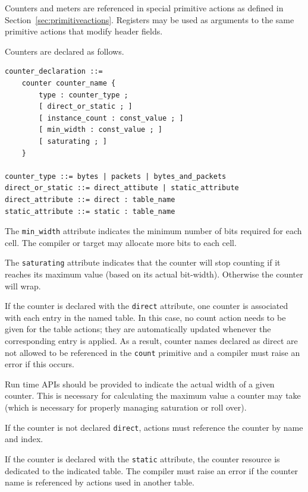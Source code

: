 \documentclass[12pt]{article}
\begin{document}
Counters and meters are referenced in special primitive actions as defined 
in Section~\ref{sec:primitiveactions}. Registers may be used as arguments to 
the same primitive actions that modify header fields.


Counters are declared as follows.

\begin{lstlisting}[style=BNFstyle]
counter_declaration ::=
    counter counter_name { 
        type : counter_type ;
        [ direct_or_static ; ]
        [ instance_count : const_value ; ]
        [ min_width : const_value ; ]
        [ saturating ; ]
    }

counter_type ::= bytes | packets | bytes_and_packets
direct_or_static ::= direct_attibute | static_attribute
direct_attribute ::= direct : table_name
static_attribute ::= static : table_name
\end{lstlisting}


The \texttt{min_width} attribute indicates the minimum number of bits
required for each cell.  The compiler or target may allocate more bits
to each cell.

The \texttt{saturating} attribute indicates that the counter will stop
counting if it reaches its maximum value (based on its actual
bit-width). Otherwise the counter will wrap.

If the counter is declared with the \texttt{direct} attribute, one
counter is associated with each entry in the named table. In this
case, no count action needs to be given for the table actions; they
are automatically updated whenever the corresponding entry is
applied. As a result, counter names declared as direct are not allowed
to be referenced in the \texttt{count} primitive and a compiler must
raise an error if this occurs.

Run time APIs should be provided to indicate the actual width of a
given counter.  This is necessary for calculating the maximum value a
counter may take (which is necessary for properly managing saturation
or roll over).

If the counter is not declared \texttt{direct}, actions must reference
the counter by name and index.

If the counter is declared with the \texttt{static} attribute, the
counter resource is dedicated to the indicated table. The compiler
must raise an error if the counter name is referenced by actions used
in another table.
\end{document}
